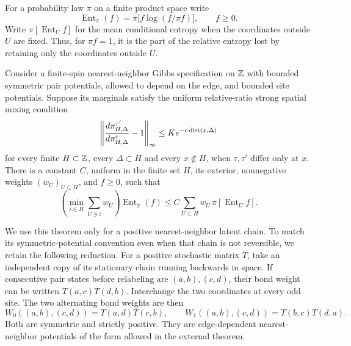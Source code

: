 For a probability law \(\pi\) on a finite product space write
\[
 \operatorname{Ent}_\pi(f)=\pi\bigl[f\log(f/\pi f)\bigr],\qquad f\ge0.
\]
Write \(\pi[\operatorname{Ent}_U f]\) for the mean conditional entropy when the coordinates outside \(U\) are fixed. Thus, for \(\pi f=1\), it is the part of the relative entropy lost by retaining only the coordinates outside \(U\).

\begin{theorem}\label{thm:caputo-parisi}
Consider a finite-spin nearest-neighbor Gibbs specification on \(\mathbb Z\) with bounded symmetric pair potentials, allowed to depend on the edge, and bounded site potentials. Suppose its marginals satisfy the uniform relative-ratio strong spatial mixing condition
\[
 \left\|\frac{d\pi_{H,\Delta}^{\tau'}}{d\pi_{H,\Delta}^{\tau}}-1\right\|_\infty
 \le K e^{-c\operatorname{dist}(x,\Delta)}
\]
for every finite \(H\subset\mathbb Z\), every \(\Delta\subset H\) and every \(x\notin H\), when \(\tau,\tau'\) differ only at \(x\). There is a constant \(C\), uniform in the finite set \(H\), its exterior, nonnegative weights \((w_U)_{U\subset H}\), and \(f\ge0\), such that
\begin{equation}\label{eq:CP}
 \left(\min_{i\in H}\sum_{U\ni i}w_U\right)
 \operatorname{Ent}_\pi(f)
 \le C\sum_{U\subset H}w_U\,\pi[\operatorname{Ent}_U f].
\end{equation}
\end{theorem}

We use this theorem only for a positive nearest-neighbor latent chain. To match its symmetric-potential convention even when that chain is not reversible, we retain the following reduction. For a positive stochastic matrix \(T\), take an independent copy of its stationary chain running backwards in space. If consecutive pair states before relabeling are \((a,b),(c,d)\), their bond weight can be written \(T(a,c)T(d,b)\). Interchange the two coordinates at every odd site. The two alternating bond weights are then
\[
 W_0((a,b),(c,d))=T(a,d)T(c,b),\qquad
 W_1((a,b),(c,d))=T(b,c)T(d,a).
\]
Both are symmetric and strictly positive. They are edge-dependent nearest-neighbor potentials of the form allowed in the external theorem.

